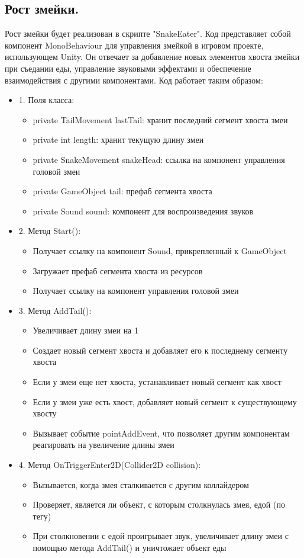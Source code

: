 \subsection{Рост змейки.}
Рост змейки будет реализован в скрипте "SnakeEater". Код представляет собой компонент MonoBehaviour для управления змейкой в игровом проекте, использующем Unity. Он отвечает за добавление новых элементов хвоста змейки при съедании еды, управление звуковыми эффектами и обеспечение взаимодействия с другими компонентами. Код работает таким образом:
\begin{itemize}
\item 1. Поля класса:
   \begin{itemize}
       \item private TailMovement lastTail: хранит последний сегмент хвоста змеи
       \item private int length: хранит текущую длину змеи
       \item private SnakeMovement snakeHead: ссылка на компонент управления головой змеи
       \item private GameObject tail: префаб сегмента хвоста
       \item private Sound sound: компонент для воспроизведения звуков
   \end{itemize}
\item 2. Метод Start():
    \begin{itemize}
       \item Получает ссылку на компонент Sound, прикрепленный к GameObject
       \item Загружает префаб сегмента хвоста из ресурсов
       \item Получает ссылку на компонент управления головой змеи
    \end{itemize}
\item 3. Метод AddTail():
    \begin{itemize}
       \item Увеличивает длину змеи на 1
       \item Создает новый сегмент хвоста и добавляет его к последнему сегменту хвоста
       \item Если у змеи еще нет хвоста, устанавливает новый сегмент как хвост
       \item Если у змеи уже есть хвост, добавляет новый сегмент к существующему хвосту
       \item Вызывает событие pointAddEvent, что позволяет другим компонентам реагировать на увеличение длины змеи
    \end{itemize}

\item 4. Метод OnTriggerEnter2D(Collider2D collision):
\begin{itemize}
\item Вызывается, когда змея сталкивается с другим коллайдером
\item Проверяет, является ли объект, с которым столкнулась змея, едой (по тегу)
\item При столкновении с едой проигрывает звук, увеличивает длину змеи с помощью метода AddTail() и уничтожает объект еды
\end{itemize}
\end{itemize}
